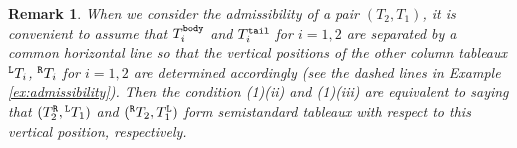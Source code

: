 \documentclass[leqno,11pt]{amsart}
\newtheorem{rem}[thm]{\bf Remark}
\numberwithin{equation}{section}
\newcommand{\la}{\lambda}
\begin{document}
\begin{rem}\label{rem:vertical position}
{\rm
When we consider the admissibility of a pair $(T_2,T_1)$, it is convenient to assume that $T^{\tt body}_i$ and $T^{\tt tail}_i$ for $i=1,2$ are separated by a common horizontal line so that the vertical positions of the other column tableaux ${}^{\tt L}T_i$, ${}^{\tt R}T_i$ for $i=1,2$ are determined accordingly (see the dashed lines in Example \ref{ex:admissibility}).
Then the condition (1)(ii) and (1)(iii) are equivalent to saying that $(T^{\tt R}_2,{}^{\tt L}T_1)$ and $({}^{\tt R}T_2,T^{\tt L}_1)$ form semistandard tableaux with respect to this vertical position, respectively.
}
\end{rem}
\end{document}
